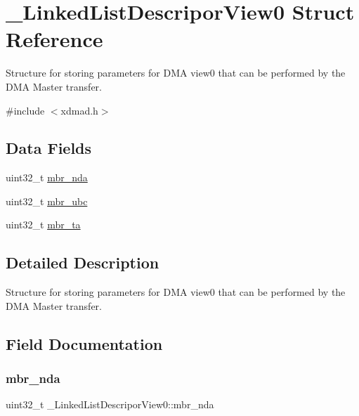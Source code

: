 \hypertarget{struct__LinkedListDescriporView0}{}\section{\+\_\+\+Linked\+List\+Descripor\+View0 Struct Reference}
\label{struct__LinkedListDescriporView0}


Structure for storing parameters for D\+MA view0 that can be performed by the D\+MA Master transfer.  




{\ttfamily \#include $<$xdmad.\+h$>$}

\subsection*{Data Fields}
\begin{DoxyCompactItemize}
\item 
uint32\+\_\+t \mbox{\hyperlink{struct__LinkedListDescriporView0_a4160f054591adab626bec3e5e9005a28}{mbr\+\_\+nda}}
\item 
uint32\+\_\+t \mbox{\hyperlink{struct__LinkedListDescriporView0_afd9e646d053432881d446251ef7abe63}{mbr\+\_\+ubc}}
\item 
uint32\+\_\+t \mbox{\hyperlink{struct__LinkedListDescriporView0_a9f9416e944804c20e7e3add5dff02b44}{mbr\+\_\+ta}}
\end{DoxyCompactItemize}


\subsection{Detailed Description}
Structure for storing parameters for D\+MA view0 that can be performed by the D\+MA Master transfer. 

\subsection{Field Documentation}
\mbox{\label{struct__LinkedListDescriporView0_a4160f054591adab626bec3e5e9005a28}} 
\subsubsection{\texorpdfstring{mbr\_nda}{mbr\_nda}}
{\footnotesize\ttfamily uint32\+\_\+t \+\_\+\+Linked\+List\+Descripor\+View0\+::mbr\+\_\+nda}

